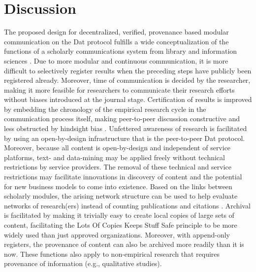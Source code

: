\documentclass[publications,article,submit,moreauthors,pdftex,10pt,a4paper]{Definitions/mdpi}
\begin{document}
\section*{Discussion}

The proposed design for decentralized, verified, provenance based
modular communication on the Dat protocol fulfills a wide
conceptualization of the functions of a scholarly communications
system from library and information sciences
\citep{roosendaal1998,doi:10.1045/september2004-vandesompel}. Due to
more modular and continuous communication, it is more difficult to
selectively register results when the preceding steps have publicly
been registered already. Moreover, time of communication is decided by
the researcher, making it more feasible for researchers to communicate
their research efforts without biases introduced at the journal
stage. Certification of results is improved by embedding the
chronology of the empirical research cycle in the communication
process itself, making peer-to-peer discussion constructive and less
obstructed by hindsight bias
\citep{doi:10.1037/1089-2680.2.2.175}. Unfettered awareness of
research is facilitated by using an open-by-design infrastructure that
is the peer-to-peer Dat protocol. Moreover, because all content is
open-by-design and independent of service platforms, text- and
data-mining may be applied freely without technical restrictions by
service providers. The removal of these technical and service
restrictions may facilitate innovations in discovery of content and
the potential for new business models to come into existence. Based on
the links between scholarly modules, the arising network structure can
be used to help evaluate networks of research(ers) instead of counting
publications and citations \citep{doi:10.3390/publications6020021}.
Archival is facilitated by making it trivially easy to create local
copies of large sets of content, facilitating the Lots Of Copies Keeps
Stuff Safe
\citep[LOCKSS;][]{doi:10.1045/june2001-reich,doi:10.1103/physreve.95.022313}
principle to be more widely used than just approved
organizations. Moreover, with append-only registers, the provenance of
content can also be archived more readily than it is now. These
functions also apply to non-empirical research that requires
provenance of information (e.g., qualitative studies).
\end{document}
